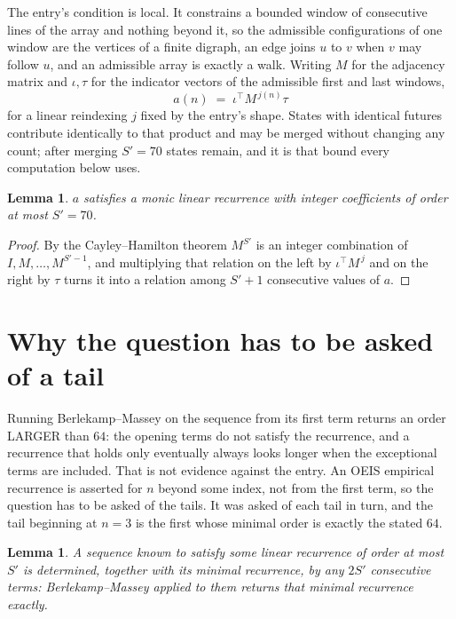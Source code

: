 \documentclass[11pt,a4paper]{article}
\theoremstyle{plain}
\newtheorem{lemma}[theorem]{Lemma}
\theoremstyle{definition}
\begin{document}
The entry's condition is local. It constrains a bounded window of consecutive lines of the
array and nothing beyond it, so the admissible configurations of one window are the vertices of
a finite digraph, an edge joins $u$ to $v$ when $v$ may follow $u$, and an admissible array is
exactly a walk. Writing $M$ for the adjacency matrix and $\iota,\tau$ for the indicator vectors
of the admissible first and last windows,
\[
a(n)\;=\;\iota^{\!\top}M^{\,j(n)}\tau
\]
for a linear reindexing $j$ fixed by the entry's shape. States with identical futures
contribute identically to that product and may be merged without changing any count; after
merging $S'=70$ states remain, and it is that bound every computation below uses.

\begin{lemma}\label{lem:cf}
$a$ satisfies a monic linear recurrence with integer coefficients of order at most $S'=70$.
\end{lemma}

\begin{proof}
By the Cayley--Hamilton theorem $M^{S'}$ is an integer combination of $I,M,\dots,M^{S'-1}$,
and multiplying that relation on the left by $\iota^{\!\top}M^{\,j}$ and on the right by
$\tau$ turns it into a relation among $S'+1$ consecutive values of $a$.
\end{proof}

\section{Why the question has to be asked of a tail}

Running Berlekamp--Massey on the sequence from its first term returns an order LARGER than $64$: the opening terms do not satisfy the recurrence, and a recurrence that holds only eventually always looks longer when the exceptional terms are included. That is not evidence against the entry. An OEIS empirical recurrence is asserted for $n$ beyond some index, not from the first term, so the question has to be asked of the tails. It was asked of each tail in turn, and the tail beginning at $n=3$ is the first whose minimal order is exactly the stated $64$.

\begin{lemma}\label{lem:bm}
A sequence known to satisfy some linear recurrence of order at most $S'$ is determined,
together with its minimal recurrence, by any $2S'$ consecutive terms: Berlekamp--Massey applied
to them returns that minimal recurrence exactly.
\end{lemma}
\end{document}
